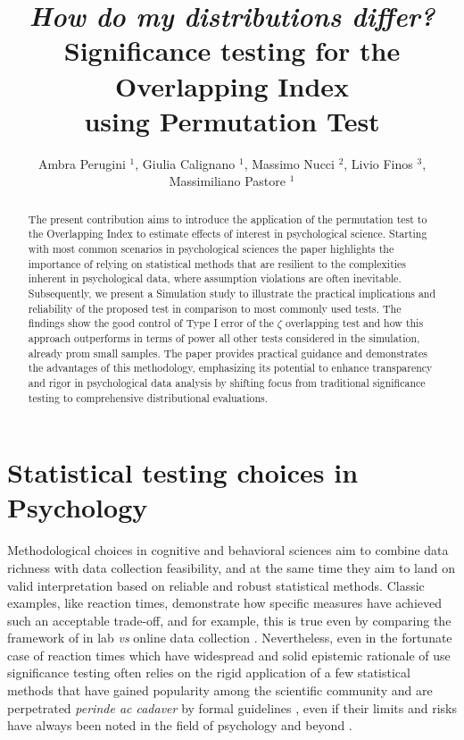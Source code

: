 \documentclass[twocolumn]{article}\usepackage[]{graphicx}\usepackage[]{xcolor}
\begin{document}
\title{\textbf{\textit{How do my distributions differ?} \\ Significance testing for the Overlapping Index \\ using Permutation Test}} %
\author{Ambra Perugini $^1$, Giulia Calignano $^1$, Massimo Nucci $^2$, Livio Finos $^3$, Massimiliano Pastore $^1$}

\maketitle



\begin{abstract}
The present contribution aims to introduce the application of the permutation test to the Overlapping Index to estimate effects of interest in psychological science. Starting with most common scenarios in psychological sciences the paper highlights the importance of relying on statistical methods that are resilient to the complexities inherent in psychological data, where assumption violations are often inevitable. Subsequently, we present a Simulation study to illustrate the practical implications and reliability of the proposed test in comparison to most commonly used tests. The findings show the good control of Type I error of the $\zeta$ overlapping test and how this approach outperforms in terms of power all other tests considered in the simulation, already prom small samples. The paper provides practical guidance and demonstrates the advantages of this methodology, emphasizing its potential to enhance transparency and rigor in psychological data analysis by shifting focus from traditional significance testing to comprehensive distributional evaluations.
\end{abstract}

\section{Statistical testing choices in Psychology}

    Methodological choices in cognitive and behavioral sciences aim to combine data richness with data collection feasibility, and at the same time they aim to land on valid interpretation based on reliable and robust statistical methods. Classic examples, like reaction times, demonstrate how specific measures have achieved such an acceptable trade-off, and for example, this is true even by comparing the framework of in lab \textit{vs} online data collection \cite{semmelmann2017online}. Nevertheless, even in the fortunate case of reaction times which have widespread and solid epistemic rationale of use \cite{grosjean2001timing, proctor2018hick, silverman2010simple} significance testing often relies on the rigid application of a few statistical methods that have gained popularity among the scientific community and are perpetrated \textit{perinde ac cadaver} by formal guidelines \cite{cumming2012statistical}, even if their limits and risks have always been noted in the field of psychology and beyond \cite{boneau1960effects}. 
    
\end{document}
